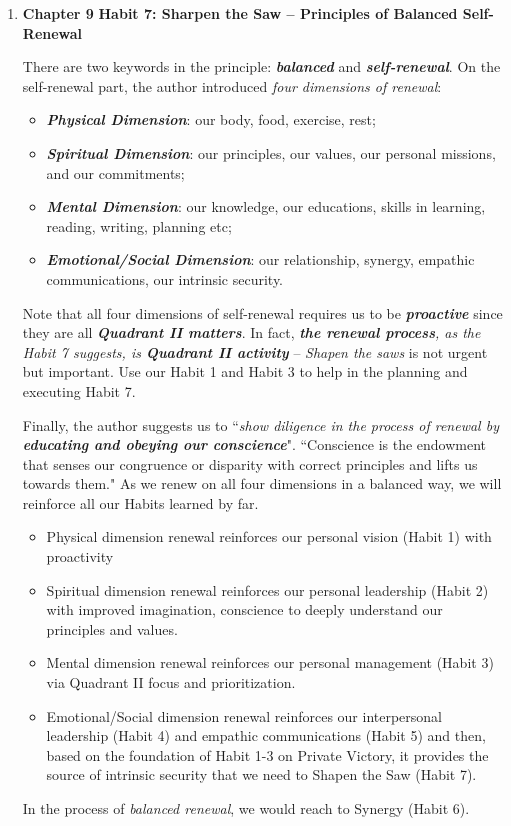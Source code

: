 \documentclass[11pt]{article}
\begin{document}
\begin{enumerate}
\begin{enumerate}
\item \textbf{Chapter 9} \textbf{Habit 7: Sharpen the Saw -- Principles of Balanced Self-Renewal}

There are two keywords in the principle: \emph{\textbf{balanced}} and \emph{\textbf{self-renewal}}. On the self-renewal part, the author introduced \emph{four dimensions of renewal}:
\begin{itemize}
\item \emph{\textbf{Physical Dimension}}: our body, food, exercise, rest;
\item \emph{\textbf{Spiritual Dimension}}: our principles, our values, our personal missions, and our commitments;
\item \emph{\textbf{Mental Dimension}}: our knowledge, our educations, skills in learning, reading, writing, planning etc;
\item \emph{\textbf{Emotional/Social Dimension}}: our relationship, synergy, empathic communications, our intrinsic security.
\end{itemize} 
Note that all four dimensions of self-renewal requires us to be \emph{\textbf{proactive}} since they are all \emph{\textbf{Quadrant II matters}}. In fact, \emph{\textbf{the renewal process}, as the Habit 7 suggests, is \textbf{Quadrant II activity}} -- \emph{Shapen the saws} is not urgent but important. Use our Habit 1 and Habit 3 to help in the planning and executing Habit 7. 

Finally, the author suggests us to ``\emph{show diligence in the process of renewal by \textbf{educating and obeying our conscience}}". ``Conscience is the endowment that senses our congruence or disparity with correct principles and lifts us towards them." As we renew on all four dimensions in a balanced way, we will reinforce all our Habits learned by far. 
\begin{itemize}
\item Physical dimension renewal reinforces our personal vision (Habit 1) with proactivity
\item Spiritual dimension renewal reinforces our personal leadership (Habit 2) with improved imagination, conscience to deeply understand our principles and values.
\item Mental dimension renewal reinforces our personal management (Habit 3) via Quadrant II focus and prioritization.
\item Emotional/Social dimension renewal reinforces our interpersonal leadership (Habit 4) and empathic communications (Habit 5) and then, based on the foundation of Habit 1-3 on Private Victory, it provides the source of intrinsic security that we need to Shapen the Saw (Habit 7).
\end{itemize} In the process of \emph{balanced renewal}, we would reach to Synergy (Habit 6).


\end{enumerate}
\end{enumerate}
\end{document}
